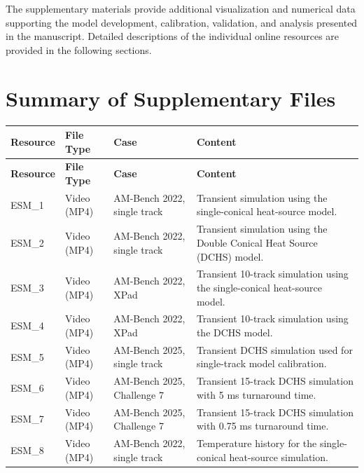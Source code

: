 \documentclass[11pt]{article}
\begin{document}
The supplementary materials provide additional visualization and numerical
data supporting the model development, calibration, validation, and analysis
presented in the manuscript. Detailed descriptions of the individual online
resources are provided in the following sections.

\section*{Summary of Supplementary Files}

\begin{longtable}{p{} p{} p{} p{}}
\toprule
\textbf{Resource} & \textbf{File Type} & \textbf{Case} & \textbf{Content} \\
\midrule
\endfirsthead

\toprule
\textbf{Resource} & \textbf{File Type} & \textbf{Case} & \textbf{Content} \\
\midrule
\endhead

ESM\_1 &
Video (MP4) &
AM-Bench 2022, single track &
Transient simulation using the single-conical heat-source model. \\

ESM\_2 &
Video (MP4) &
AM-Bench 2022, single track &
Transient simulation using the Double Conical Heat Source (DCHS) model. \\

ESM\_3 &
Video (MP4) &
AM-Bench 2022, XPad &
Transient 10-track simulation using the single-conical heat-source model. \\

ESM\_4 &
Video (MP4) &
AM-Bench 2022, XPad &
Transient 10-track simulation using the DCHS model. \\

ESM\_5 &
Video (MP4) &
AM-Bench 2025, single track &
Transient DCHS simulation used for single-track model calibration. \\

ESM\_6 &
Video (MP4) &
AM-Bench 2025, Challenge 7 &
Transient 15-track DCHS simulation with 5 ms turnaround time. \\

ESM\_7 &
Video (MP4) &
AM-Bench 2025, Challenge 7 &
Transient 15-track DCHS simulation with 0.75 ms turnaround time. \\

\midrule

ESM\_8 &
Video (MP4) &
AM-Bench 2022, single track &
Temperature history for the single-conical heat-source simulation. \\


\end{longtable}
\end{document}

